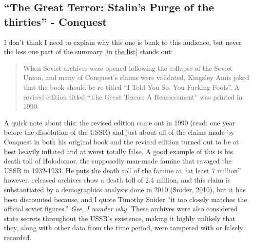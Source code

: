 \subsection{``The Great Terror: Stalin's Purge of the thirties'' - Conquest}
I don't think I need to explain why this one is bunk to this audience, but never the less one part of the summary [in \href{https://www.reddit.com/r/EnoughCommieSpam/wiki/anti_commie_resources}{the list}] stands out:
\begin{quote}
    When Soviet archives were opened following the collapse of the Soviet Union, and many of Conquest's claims were validated, Kingsley Amis joked that the book should be re-titled ``I Told You So, You Fucking Fools''.
    A revised edition titled ``The Great Terror: A Reassessment'' was printed in 1990.
\end{quote}
A quick note about this: the revised edition came out in 1990 (read: one year before the dissolution of the USSR) and just about all of the claims made by Conquest in both his original book and the revised edition turned out to be at best heavily inflated and at worst totally false.
A good example of this is his death toll of Holodomor, the supposedly man-made famine that ravaged the USSR in 1932-1933.
He puts the death toll of the famine at ``at least 7 million'' however, released archives show a death toll of 2.4 million, and this claim is substantiated by a demographics analysis done in 2010 (Snider, 2010), but it has been discounted because, and I quote Timothy Snider ``it too closely matches the official soviet figures.''
\emph{Gee, I wonder why.}
These archives were also considered state secrets throughout the USSR's existence, making it highly unlikely that they, along with other data from the time period, were tampered with or falsely recorded.



